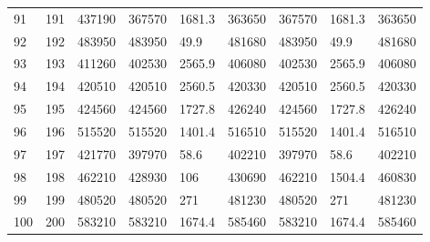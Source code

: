 \begin{tabular}{lllllllll}
91 & 191 & 437190 & 367570 & 1681.3 & 363650 & 367570 & 1681.3 & 363650 \\ 
92 & 192 & 483950 & 483950 & 49.9 & 481680 & 483950 & 49.9 & 481680 \\ 
93 & 193 & 411260 & 402530 & 2565.9 & 406080 & 402530 & 2565.9 & 406080 \\ 
94 & 194 & 420510 & 420510 & 2560.5 & 420330 & 420510 & 2560.5 & 420330 \\ 
95 & 195 & 424560 & 424560 & 1727.8 & 426240 & 424560 & 1727.8 & 426240 \\ 
96 & 196 & 515520 & 515520 & 1401.4 & 516510 & 515520 & 1401.4 & 516510 \\ 
97 & 197 & 421770 & 397970 & 58.6 & 402210 & 397970 & 58.6 & 402210 \\ 
98 & 198 & 462210 & 428930 & 106 & 430690 & 462210 & 1504.4 & 460830 \\ 
99 & 199 & 480520 & 480520 & 271 & 481230 & 480520 & 271 & 481230 \\ 
100 & 200 & 583210 & 583210 & 1674.4 & 585460 & 583210 & 1674.4 & 585460 \\ 
\hline 
\end{tabular}